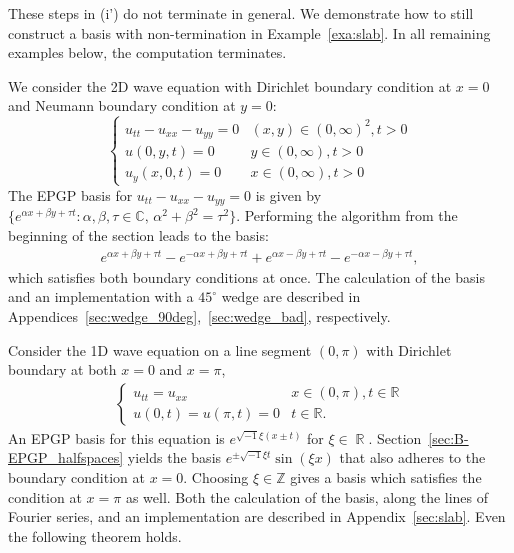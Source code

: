 \documentclass{article} %
\theoremstyle{plain}
\theoremstyle{definition}
\theoremstyle{remark}
\newenvironment{example}
  {\pushQED{\qed}\renewcommand{\qedsymbol}{$\triangle$}\examplex}
  {\popQED\endexamplex}
\DeclareMathOperator*{\R}{\mathbb{R}}
\newcommand{\CC}{\mathbb{C}}
\newcommand{\RR}{\mathbb{R}}
\begin{document}

These steps in (i') do not terminate in general.
We demonstrate how to still construct a basis with non-termination in Example~\ref{exa:slab}.
In all remaining examples below, the computation terminates. 



\begin{example}[Wedge]\label{exa:wedge}
We consider the 2D wave equation with Dirichlet boundary condition at \(x=0\) and Neumann boundary condition at \(y=0\):
    \[
    \begin{cases}
        u_{tt}-u_{xx}-u_{yy}=0&(x,y)\in(0,\infty)^2,t>0\\
        u(0,y,t)=0& y\in(0,\infty),t>0\\
        u_y(x,0,t)=0 &x\in(0,\infty),t>0
    \end{cases}
    \]
The EPGP basis for     \(        u_{tt}-u_{xx}-u_{yy}=0\) is given  by
    $
    \{e^{\alpha x+\beta y+\tau t}\colon \alpha,\beta,\tau\in\CC,\,\alpha^2+\beta^2=\tau^2\}.
    $    
   Performing the algorithm from the beginning of the section leads to the basis: 
    \begin{align*}
       e^{\alpha x+\beta y+\tau t}-e^{-\alpha x+\beta y+\tau t}+e^{\alpha x-\beta y+\tau t}-e^{-\alpha x-\beta y+\tau t},
    \end{align*}
    which  satisfies both boundary conditions at once. The calculation of the basis and an implementation with a $45^\circ$ wedge are described in Appendices~\ref{sec:wedge_90deg},~\ref{sec:wedge_bad}, respectively.
\end{example}

\begin{example}[Infinite slab]\label{exa:slab}
    Consider the 1D wave equation on a line segment \((0,\pi)\) with Dirichlet boundary at both \(x=0\) and \(x=\pi\),
    \begin{align}\label{eq:wave_slab}
    \begin{cases}
        u_{tt}=u_{xx} &x\in(0,\pi), t\in\RR\\
        u(0,t)=u(\pi,t)=0 &t\in\RR.
    \end{cases}
    \end{align}
    An EPGP basis for this equation is 
    \(e^{\sqrt{-1}\xi( x\pm t)}\) for $\xi\in\R$. Section~\ref{sec:B-EPGP_halfspaces} yields the basis
    $
        e^{\pm \sqrt{-1}\xi t}\sin(\xi x)
    $
    that also adheres to the boundary condition at $x=0$.
    Choosing $\xi\in \mathbb Z$ gives a basis which satisfies the condition at $x=\pi$ as well. Both the calculation of the basis, along the lines of Fourier series, and an implementation are described in Appendix~\ref{sec:slab}.
    Even the following theorem holds.
\end{example}
\end{document}
